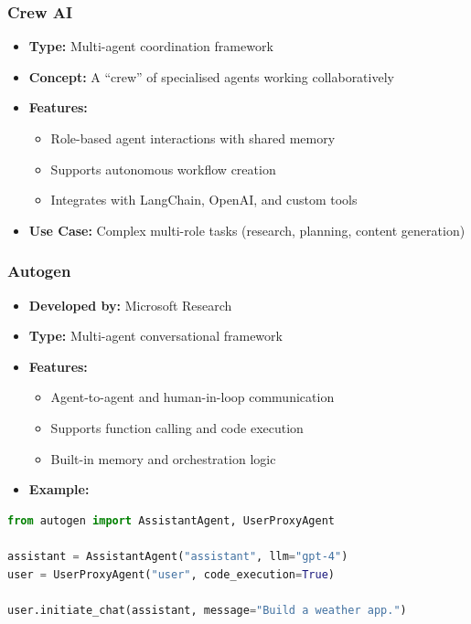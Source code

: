 \begin{frame}[fragile]\frametitle{Crew AI}
    \begin{itemize}
        \item \textbf{Type:} Multi-agent coordination framework
        \item \textbf{Concept:} A ``crew'' of specialised agents working collaboratively
        \item \textbf{Features:}
              \begin{itemize}
                  \item Role-based agent interactions with shared memory
                  \item Supports autonomous workflow creation
                  \item Integrates with LangChain, OpenAI, and custom tools
              \end{itemize}
        \item \textbf{Use Case:} Complex multi-role tasks (research, planning, content generation)
    \end{itemize}
\end{frame}

\begin{frame}[fragile]\frametitle{Autogen}
    \begin{itemize}
        \item \textbf{Developed by:} Microsoft Research
        \item \textbf{Type:} Multi-agent conversational framework
        \item \textbf{Features:}
              \begin{itemize}
                  \item Agent-to-agent and human-in-loop communication
                  \item Supports function calling and code execution
                  \item Built-in memory and orchestration logic
              \end{itemize}
        \item \textbf{Example:}
    \end{itemize}
\begin{lstlisting}[language=Python]
from autogen import AssistantAgent, UserProxyAgent

assistant = AssistantAgent("assistant", llm="gpt-4")
user = UserProxyAgent("user", code_execution=True)

user.initiate_chat(assistant, message="Build a weather app.")
\end{lstlisting}
\end{frame}

